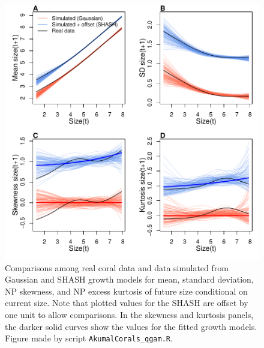 \documentclass[12pt]{article}
\begin{document}
\begin{spacing}{1.35}
\begin{figure}[tbp]
	\centering
	\includegraphics[width=1.0\textwidth]{figures/coral_SHASH_fit.pdf}
	\caption{Comparisons among real coral data and data simulated from Gaussian and SHASH growth models for mean, 
		standard deviation, NP skewness, and NP excess kurtosis of future size conditional on current size. Note that plotted values for the SHASH are offset by one unit to allow comparisons. 
		In the skewness and kurtosis panels, the darker solid curves show the values for the fitted growth models. 
		Figure made by script \texttt{AkumalCorals\_qgam.R}.}
	\label{fig:coral_fit}
\end{figure} 


\end{spacing}
\end{document}
